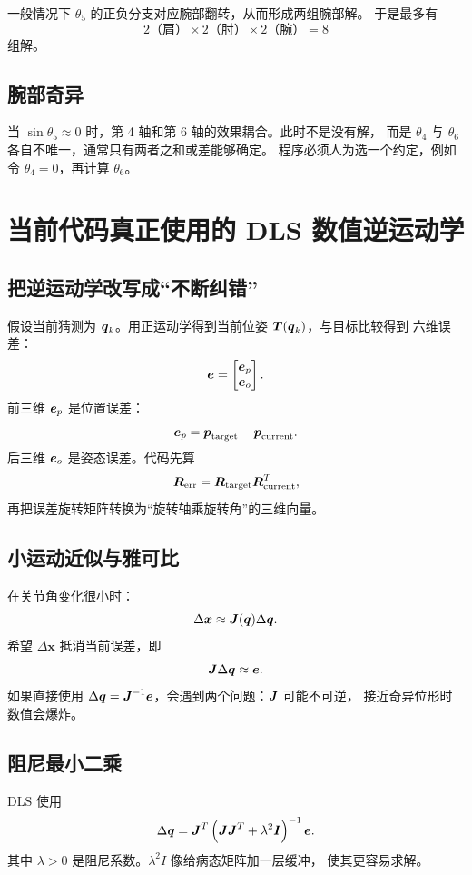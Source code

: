 一般情况下 $\theta_5$ 的正负分支对应腕部翻转，从而形成两组腕部解。
于是最多有
\[
2\text{（肩）}\times2\text{（肘）}\times2\text{（腕）}=8
\]
组解。

\subsection{腕部奇异}

当 $\sin\theta_5\approx0$ 时，第 4 轴和第 6 轴的效果耦合。此时不是没有解，
而是 $\theta_4$ 与 $\theta_6$ 各自不唯一，通常只有两者之和或差能够确定。
程序必须人为选一个约定，例如令 $\theta_4=0$，再计算 $\theta_6$。

\section{当前代码真正使用的 DLS 数值逆运动学}

\subsection{把逆运动学改写成“不断纠错”}

假设当前猜测为 $\boldsymbol{q}_k$。用正运动学得到当前位姿 $\boldsymbol{T}(\boldsymbol{q}_k)$，与目标比较得到
六维误差：
\[
\boldsymbol{e}=
\begin{bmatrix}
\boldsymbol{e}_p\\
\boldsymbol{e}_o
\end{bmatrix}.
\]
前三维 $\boldsymbol{e}_p$ 是位置误差：
\[
\boldsymbol{e}_p=\boldsymbol{p}_{\mathrm{target}}-\boldsymbol{p}_{\mathrm{current}}.
\]
后三维 $\boldsymbol{e}_o$ 是姿态误差。代码先算
\[
\boldsymbol{R}_{\mathrm{err}}=
\boldsymbol{R}_{\mathrm{target}}\boldsymbol{R}_{\mathrm{current}}^T,
\]
再把误差旋转矩阵转换为“旋转轴乘旋转角”的三维向量。

\subsection{小运动近似与雅可比}

在关节角变化很小时：
\[
\Delta\boldsymbol{x}\approx\boldsymbol{J}(\boldsymbol{q})\Delta\boldsymbol{q}.
\]
希望 $\Delta\boldsymbol{x}$ 抵消当前误差，即
\[
\boldsymbol{J}\Delta\boldsymbol{q}\approx\boldsymbol{e}.
\]
如果直接使用 $\Delta\boldsymbol{q}=\boldsymbol{J}^{-1}\boldsymbol{e}$，会遇到两个问题：$\boldsymbol{J}$ 可能不可逆，
接近奇异位形时数值会爆炸。

\subsection{阻尼最小二乘}

DLS 使用
\[
\Delta\boldsymbol{q}=
\boldsymbol{J}^T\left(\boldsymbol{J}\boldsymbol{J}^T+\lambda^2\boldsymbol{I}\right)^{-1}\boldsymbol{e}.
\]
其中 $\lambda>0$ 是阻尼系数。$\lambda^2I$ 像给病态矩阵加一层缓冲，
使其更容易求解。

